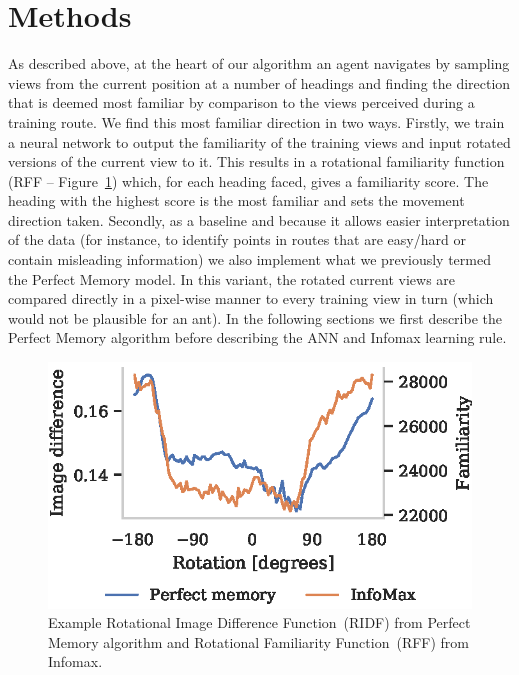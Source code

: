 \documentclass[letterpaper]{article}
\begin{document}
\section{Methods}
As described above, at the heart of our algorithm an agent navigates by sampling views from the current position at a number of headings and finding the direction that is deemed most familiar by comparison to the views perceived during a training route. 
We find this most familiar direction in two ways. 
Firstly, we train a neural network to output the familiarity of the training views and input rotated versions of the current view to it. 
This results in a rotational familiarity function (RFF -- Figure~\ref{fig:good_ridf}) which, for each heading faced, gives a familiarity score.
The heading with the highest score is the most familiar and sets the movement direction taken.
Secondly, as a baseline and because it allows easier interpretation of the data (for instance, to identify points in routes that are easy/hard or contain misleading information) we also implement what we previously termed the Perfect Memory model. 
In this variant, the rotated current views are compared directly in a pixel-wise manner to every training view in turn (which would not be plausible for an ant). 
In the following sections we first describe the Perfect Memory algorithm before describing the ANN and Infomax learning rule.

\begin{figure}[t]
    \centering
    \includegraphics{figures/good_ridf.eps}
    \caption{Example Rotational Image Difference Function~(RIDF) from Perfect Memory algorithm and Rotational Familiarity Function~(RFF) from Infomax.}
    \label{fig:good_ridf}
\end{figure}
\end{document}
